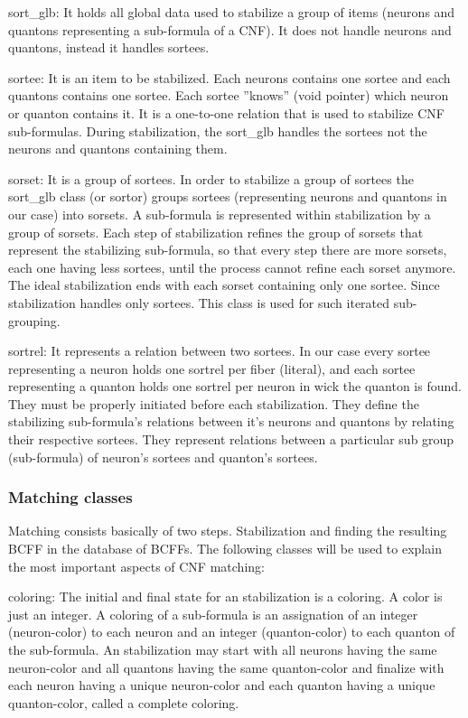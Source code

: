 \documentclass{easychair}
\newcommand{\neuron}{\textsf{neuron}}
\newcommand{\quanton}{\textsf{quanton}}
\newcommand{\sortglb}{\textsf{sort\_glb}}
\newcommand{\sortee}{\textsf{sortee}}
\newcommand{\sorset}{\textsf{sorset}}
\newcommand{\sortrel}{\textsf{sortrel}}
\newcommand{\coloring}{\textsf{coloring}}
\begin{document}
{\sortglb}: It holds all global data used to stabilize a group of items ({\neuron}s and {\quanton}s representing a sub-formula of a CNF). It does not handle {\neuron}s and {\quanton}s, instead it handles {\sortee}s.

{\sortee}: It is an item to be stabilized. Each {\neuron}s contains one {\sortee} and each {\quanton}s contains one {\sortee}. Each {\sortee} ''knows'' (void pointer) which {\neuron} or {\quanton} contains it. It is a one-to-one relation that is used to stabilize CNF sub-formulas. During stabilization, the {\sortglb} handles the {\sortee}s not the {\neuron}s and {\quanton}s containing them.

{\sorset}: It is a group of {\sortee}s. In  order to stabilize a group of {\sortee}s the {\sortglb} class (or sortor) groups {\sortee}s (representing {\neuron}s and {\quanton}s in our case) into {\sorset}s. A sub-formula is represented within stabilization by a group of {\sorset}s. Each step of stabilization refines the group of {\sorset}s that represent the stabilizing sub-formula, so that every step there are more {\sorset}s, each one having less {\sortee}s, until the process cannot refine each {\sorset} anymore. The ideal stabilization ends with each {\sorset} containing only one {\sortee}. Since stabilization handles only {\sortee}s. This class is used for such iterated sub-grouping.

{\sortrel}: It represents a relation between two {\sortee}s. In our case every {\sortee} representing a {\neuron} holds one {\sortrel} per fiber (literal), and each {\sortee} representing a {\quanton} holds one {\sortrel} per {\neuron} in wick the {\quanton} is found. They must be properly initiated before each stabilization. They define the stabilizing sub-formula's relations between it's {\neuron}s and {\quanton}s by relating their respective {\sortee}s. They represent relations between a particular sub group (sub-formula) of {\neuron}'s {\sortee}s and {\quanton}'s {\sortee}s.

\subsubsection{Matching classes}

Matching consists basically of two steps. Stabilization and finding the resulting BCFF in the database of BCFFs. The following classes will be used to explain the most important aspects of CNF matching:

{\coloring}: The initial and final state for an stabilization is a {\coloring}. A color is just an integer. A {\coloring} of a sub-formula is an assignation of an integer ({\neuron}-color) to each {\neuron} and an integer ({\quanton}-color) to each {\quanton} of the sub-formula. An stabilization may start with all {\neuron}s having the same {\neuron}-color and all {\quanton}s having the same {\quanton}-color and finalize with each {\neuron} having a unique {\neuron}-color and each {\quanton} having a unique {\quanton}-color, called a complete {\coloring}. 
\end{document}
